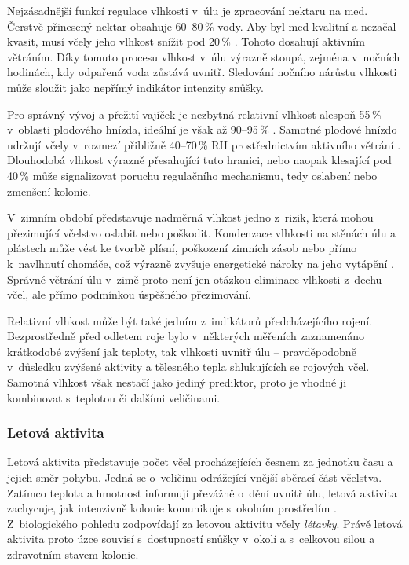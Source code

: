 Nejzásadnější funkcí regulace vlhkosti v~úlu je zpracování nektaru na med. Čerstvě přinesený nektar obsahuje 60--80\,\% vody. Aby byl med kvalitní a nezačal kvasit, musí včely jeho vlhkost snížit pod 20\,\% \cite{nettie}. Tohoto dosahují aktivním větráním. Díky tomuto procesu vlhkost v~úlu výrazně stoupá, zejména v~nočních hodinách, kdy odpařená voda zůstává uvnitř. Sledování nočního nárůstu vlhkosti může sloužit jako nepřímý indikátor intenzity snůšky.

Pro správný vývoj a přežití vajíček je nezbytná relativní vlhkost alespoň 55\,\% v~oblasti plodového hnízda, ideální je však až 90--95\,\% \cite{Linton2019}. Samotné plodové hnízdo udržují včely v~rozmezí přibližně 40--70\,\% RH prostřednictvím aktivního větrání \cite{Linton2019}. Dlouhodobá vlhkost výrazně přesahující tuto hranici, nebo naopak klesající pod 40\,\% může signalizovat poruchu regulačního mechanismu, tedy oslabení nebo zmenšení kolonie.

V~zimním období představuje nadměrná vlhkost jedno z~rizik, která mohou přezimující včelstvo oslabit nebo poškodit. Kondenzace vlhkosti na stěnách úlu a plástech může vést ke tvorbě plísní, poškození zimních zásob nebo přímo k~navlhnutí chomáče, což výrazně zvyšuje energetické nároky na jeho vytápění \cite{Linton2019}. Správné větrání úlu v~zimě proto není jen otázkou eliminace vlhkosti z~dechu včel, ale přímo podmínkou úspěšného přezimování.

Relativní vlhkost může být také jedním z~indikátorů předcházejícího rojení. Bezprostředně před odletem roje bylo v~některých měřeních zaznamenáno krátkodobé zvýšení jak teploty, tak vlhkosti uvnitř úlu \cite{Cecchi} -- pravděpodobně v~důsledku zvýšené aktivity a tělesného tepla shlukujících se rojových včel. Samotná vlhkost však nestačí jako jediný prediktor, proto je vhodné ji kombinovat s~teplotou či dalšími veličinami.

\subsubsection*{Letová aktivita}
Letová aktivita představuje počet včel procházejících česnem za jednotku času a jejich směr pohybu. Jedná se o~veličinu odrážející vnější sběrací část včelstva. Zatímco teplota a hmotnost informují převážně o~dění uvnitř úlu, letová aktivita zachycuje, jak intenzivně kolonie komunikuje s~okolním prostředím \cite{Meikle2015}. Z~biologického pohledu zodpovídají za letovou aktivitu včely \textit{létavky}. Právě letová aktivita proto úzce souvisí s~dostupností snůšky v~okolí a s~celkovou silou a zdravotním stavem kolonie.

